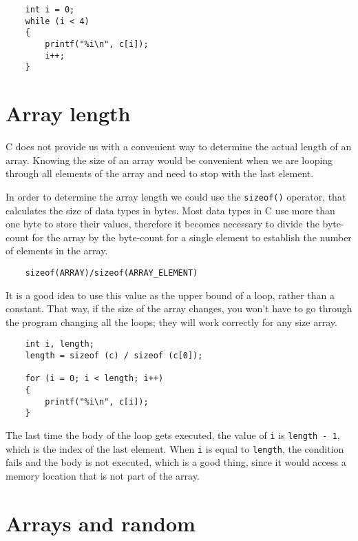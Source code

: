 \begin{verbatim}
    int i = 0;
    while (i < 4) 
    {
        printf("%i\n", c[i]);
        i++;
    }
\end{verbatim}

\section{Array length}
\label{Array length}

C does not provide us with a convenient way to determine the
actual length of an array. Knowing the size of an array would
be convenient when we are looping through all elements of
the array and need to stop with the last element.

In order to determine the array length we could use the {\tt sizeof()} 
operator, that calculates the size of data types in bytes.
Most data types in C use more than one byte to store their values,
therefore it becomes necessary to divide the byte-count for the array by 
the byte-count for a single element to establish the number of elements
in the array.
\begin{verbatim}
    sizeof(ARRAY)/sizeof(ARRAY_ELEMENT)
\end{verbatim}

It is a good idea to use this value as the upper bound of a loop,
rather than a constant.  That way, if the size of the array
changes, you won't have to go through the program changing all the
loops; they will work correctly for any size array.

\begin{verbatim}
    int i, length;
    length = sizeof (c) / sizeof (c[0]);

    for (i = 0; i < length; i++) 
    {
        printf("%i\n", c[i]);
    }
\end{verbatim}
%
The last time the body of the loop gets executed, the value of {\tt i}
is {\tt length - 1}, which is the index of the last element.  When
{\tt i} is equal to {\tt length}, the condition fails and the body
is not executed, which is a good thing, since it would access a
memory location that is not part of the array.


\pagebreak
\section{Arrays and random}

